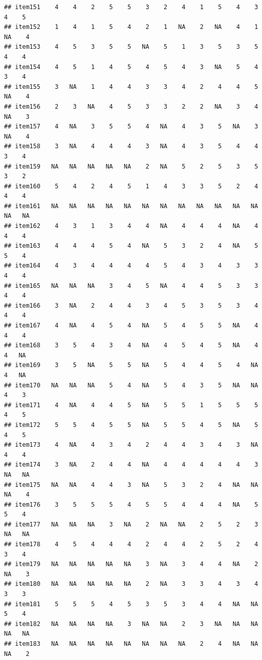 \documentclass[
  man]{apa6}
\begin{document}
\begin{verbatim}
## item151    4    4    2    5    5    3    2    4    1    5    4    3    4    5
## item152    1    4    1    5    4    2    1   NA    2   NA    4    1   NA    4
## item153    4    5    3    5    5   NA    5    1    3    5    3    5    4    4
## item154    4    5    1    4    5    4    5    4    3   NA    5    4    3    4
## item155    3   NA    1    4    4    3    3    4    2    4    4    5   NA    4
## item156    2    3   NA    4    5    3    3    2    2   NA    3    4   NA    3
## item157    4   NA    3    5    5    4   NA    4    3    5   NA    3   NA    4
## item158    3   NA    4    4    4    3   NA    4    3    5    4    4    3    4
## item159   NA   NA   NA   NA   NA    2   NA    5    2    5    3    5    3    2
## item160    5    4    2    4    5    1    4    3    3    5    2    4    4    4
## item161   NA   NA   NA   NA   NA   NA   NA   NA   NA   NA   NA   NA   NA   NA
## item162    4    3    1    3    4    4   NA    4    4    4   NA    4    4    4
## item163    4    4    4    5    4   NA    5    3    2    4   NA    5    5    4
## item164    4    3    4    4    4    4    5    4    3    4    3    3    4    4
## item165   NA   NA   NA    3    4    5   NA    4    4    5    3    3    4    4
## item166    3   NA    2    4    4    3    4    5    3    5    3    4    4    4
## item167    4   NA    4    5    4   NA    5    4    5    5   NA    4    4    4
## item168    3    5    4    3    4   NA    4    5    4    5   NA    4    4   NA
## item169    3    5   NA    5    5   NA    5    4    4    5    4   NA    4   NA
## item170   NA   NA   NA    5    4   NA    5    4    3    5   NA   NA    4    3
## item171    4   NA    4    4    5   NA    5    5    1    5    5    5    4    5
## item172    5    5    4    5    5   NA    5    5    4    5   NA    5    4    5
## item173    4   NA    4    3    4    2    4    4    3    4    3   NA    4    4
## item174    3   NA    2    4    4   NA    4    4    4    4    4    3   NA   NA
## item175   NA   NA    4    4    3   NA    5    3    2    4   NA   NA   NA    4
## item176    3    5    5    5    4    5    5    4    4    4   NA    5    5    4
## item177   NA   NA   NA    3   NA    2   NA   NA    2    5    2    3   NA   NA
## item178    4    5    4    4    4    2    4    4    2    5    2    4    3    4
## item179   NA   NA   NA   NA   NA    3   NA    3    4    4   NA    2   NA    3
## item180   NA   NA   NA   NA   NA    2   NA    3    3    4    3    4    3    3
## item181    5    5    5    4    5    3    5    3    4    4   NA   NA    5    4
## item182   NA   NA   NA   NA    3   NA   NA    2    3   NA   NA   NA   NA   NA
## item183   NA   NA   NA   NA   NA   NA   NA   NA    2    4   NA   NA   NA    2

\end{verbatim}
\end{document}
